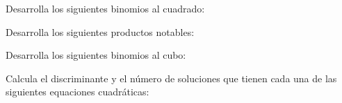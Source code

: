 \documentclass[12pt,addpoints,answers]{evalua}
\begin{document}
\begin{questions}
    \question[] Desarrolla los siguientes binomios al cuadrado:
    \begin{multicols}{2}
    \end{multicols}

    \question[] Desarrolla los siguientes productos notables:
    \begin{multicols}{2}
    \end{multicols}

    \question[] Desarrolla los siguientes binomios al cubo:

    \begin{multicols}{2}
    \end{multicols}

    \question[] Calcula el discriminante y el número de soluciones que tienen cada una de las siguientes equaciones cuadráticas:
    \begin{multicols}{2}
        \begin{parts}

\end{parts}
\end{multicols}
\end{questions}
\end{document}
